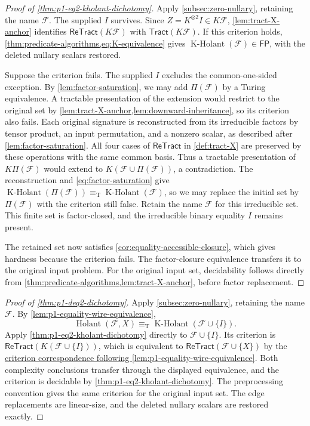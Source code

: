 \documentclass[11pt,letterpaper,onecolumn]{article}
\theoremstyle{plain}
\theoremstyle{definition}
\theoremstyle{remark}
\newcommand{\cF}{\mathcal F}
\newcommand{\Holant}{\operatorname{Holant}}
\newcommand{\KHolant}{\operatorname{K\text{-}Holant}}
\newcommand{\Tract}{\mathsf{Tract}}
\newcommand{\ReTract}{\mathsf{ReTract}}
\newcommand{\FP}{\mathsf{FP}}
\newcommand{\equivT}{\equiv_{\mathrm T}}
\begin{document}
\begin{proof}[Proof of \cref{thm:p1-eq2-kholant-dichotomy}]
Apply \cref{subsec:zero-nullary}, retaining the name \(\cF\). The supplied
\(I\) survives. Since \(Z=K^{\otimes2}I\in K\cF\),
\cref{lem:tract-X-anchor} identifies \(\ReTract(K\cF)\) with
\(\Tract(K\cF)\). If this criterion holds,
\cref{thm:predicate-algorithms,eq:K-equivalence} gives
\(\KHolant(\cF)\in\FP\), with the deleted nullary scalars restored.

Suppose the criterion fails. The supplied \(I\) excludes the
common-one-sided exception. By \cref{lem:factor-saturation}, we may add
\(\Pi(\cF)\) by a Turing equivalence. A tractable presentation of the
extension would restrict to the original set by
\cref{lem:tract-X-anchor,lem:downward-inheritance}, so its criterion also
fails. Each original signature is reconstructed from its irreducible factors
by tensor product, an input permutation, and a nonzero scalar, as
described after \cref{lem:factor-saturation}.
All four cases of \(\ReTract\) in \cref{def:tract-X} are preserved by
these operations with the same common basis. Thus a tractable presentation of
\(K\Pi(\cF)\) would extend to \(K(\cF\cup\Pi(\cF))\), a contradiction.
The reconstruction and \cref{eq:factor-saturation} give
\(\KHolant(\Pi(\cF))\equivT\KHolant(\cF)\), so we may replace the
initial set by \(\Pi(\cF)\) with the criterion still false. Retain the name \(\cF\) for this irreducible set.
This finite set is factor-closed, and the irreducible binary equality
\(I\) remains present.

The retained set now satisfies \cref{cor:equality-accessible-closure},
which gives hardness because the criterion fails. The factor-closure
equivalence transfers it to the original input problem. For the original
input set, decidability follows directly from
\cref{thm:predicate-algorithms,lem:tract-X-anchor}, before factor replacement.
\end{proof}

\begin{proof}[Proof of \cref{thm:p1-deq2-dichotomy}]
Apply \cref{subsec:zero-nullary}, retaining the name \(\cF\).
By \cref{lem:p1-equality-wire-equivalence},
\[
 \Holant(\cF,X)\equivT\KHolant(\cF\cup\{I\}).
\]
Apply \cref{thm:p1-eq2-kholant-dichotomy} directly to
\(\cF\cup\{I\}\). Its criterion is
\(\ReTract(K(\cF\cup\{I\}))\), which is equivalent to
\(\ReTract(\cF\cup\{X\})\) by the
\hyperlink{eq:retract-edge-bridge}{criterion correspondence following
\cref{lem:p1-equality-wire-equivalence}}. Both complexity conclusions transfer
through the displayed equivalence, and the criterion is decidable by
\cref{thm:p1-eq2-kholant-dichotomy}. The preprocessing convention gives
the same criterion for the original input set. The edge replacements
are linear-size, and the deleted nullary scalars are restored exactly.
\end{proof}
\end{document}
